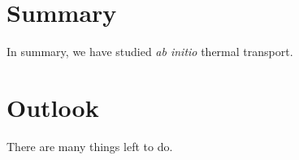 \section{Summary}

In summary, we have studied \emph{ab initio} thermal transport.

\section{Outlook}

There are many things left to do.
